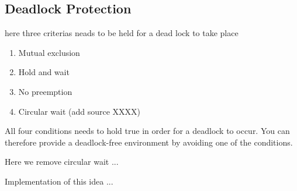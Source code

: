 \subsection{Deadlock Protection}
\label{sec:DeadlockProtection}

here three criterias neads to be held for a dead lock to take place 
\begin{enumerate}[noitemsep]
	
	\item Mutual exclusion
	
	\item Hold and wait 
	
	\item No preemption
	
	\item Circular wait (add source XXXX)
	
\end{enumerate}

All four conditions needs to hold true in order for a deadlock to occur. You can therefore provide a deadlock-free environment by avoiding one of the conditions. 

Here we remove circular wait ...

Implementation of this idea ...